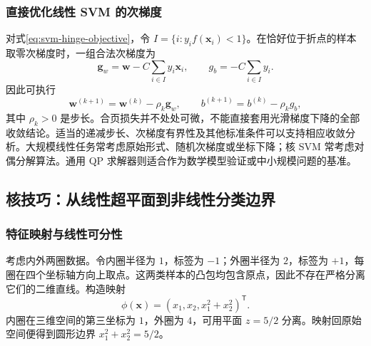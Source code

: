 \subsubsection{直接优化线性 SVM 的次梯度}

对式\eqref{eq:svm-hinge-objective}，令 $I=\{i:y_if(\boldsymbol x_i)<1\}$。在恰好位于折点的样本取零次梯度时，一组合法次梯度为
\[
\boldsymbol g_w=\boldsymbol w-C\sum_{i\in I}y_i\boldsymbol x_i,\qquad
g_b=-C\sum_{i\in I}y_i.
\]
因此可执行
\[
\boldsymbol w^{(k+1)}=\boldsymbol w^{(k)}-\rho_k\boldsymbol g_w,
\qquad b^{(k+1)}=b^{(k)}-\rho_kg_b,
\]
其中 $\rho_k>0$ 是步长。合页损失并不处处可微，不能直接套用光滑梯度下降的全部收敛结论。适当的递减步长、次梯度有界性及其他标准条件可以支持相应收敛分析。大规模线性任务常考虑原始形式、随机次梯度或坐标下降；核 SVM 常考虑对偶分解算法。通用 QP 求解器则适合作为数学模型验证或中小规模问题的基准。

\subsection{核技巧：从线性超平面到非线性分类边界}

\subsubsection{特征映射与线性可分性}

考虑内外两圈数据。令内圈半径为 $1$，标签为 $-1$；外圈半径为 $2$，标签为 $+1$，每圈在四个坐标轴方向上取点。这两类样本的凸包均包含原点，因此不存在严格分离它们的二维直线。构造映射
\[
\phi(\boldsymbol x)=(x_1,x_2,x_1^2+x_2^2)^{\mathsf T}.
\]
内圈在三维空间的第三坐标为 $1$，外圈为 $4$，可用平面 $z=5/2$ 分离。映射回原始空间便得到圆形边界
$x_1^2+x_2^2=5/2$。

